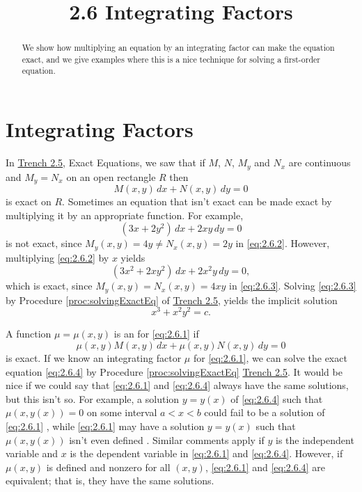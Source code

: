 \documentclass{ximera}
\title{2.6 Integrating Factors}
\begin{document}
\begin{abstract}
We show how multiplying an equation by an integrating factor can make the equation exact, and we give examples where this is a nice technique for solving a first-order equation.
\end{abstract}

\maketitle



\section*{Integrating Factors}
In \href{https://ximera.osu.edu/ode/main/exactEquations/exactEquations}{Trench 2.5}, Exact Equations, we saw that if $M$, $N$, $M_y$ and $N_x$ are
continuous and $M_y=N_x$ on an open rectangle $R$ then
\begin{equation} \label{eq:2.6.1}
M(x,y)\,dx+N(x,y)\,dy=0
\end{equation}
is exact on $R$. Sometimes an equation that isn't  exact can be made
exact by multiplying it by an appropriate function. For example,
\begin{equation}\label{eq:2.6.2}
(3x+2y^2)\,dx+2xy\,dy=0
\end{equation}
is  not exact, since
$M_y(x,y)=4y\neq  N_x(x,y)=2y$ in \eqref{eq:2.6.2}.
 However, multiplying \eqref{eq:2.6.2}  by $x$ yields
\begin{equation}\label{eq:2.6.3}
(3x^2+2xy^2)\,dx+2x^2y\,dy=0,
\end{equation}
which is exact, since
$M_y(x,y)=N_x(x,y)=4xy$ in \eqref{eq:2.6.3}.
Solving \eqref{eq:2.6.3} by Procedure \ref{proc:solvingExactEq} of \href{https://ximera.osu.edu/ode/main/exactEquations/exactEquations}{Trench 2.5},
 yields the implicit solution
$$
x^3+x^2y^2=c.
$$

A function $\mu=\mu(x,y)$ is  an  for
\eqref{eq:2.6.1}  if
\begin{equation}\label{eq:2.6.4}
 \mu(x,y)M (x,y)\,dx+\mu(x,y)N (x,y)\,dy=0
 \end{equation}
 is exact. If we know an integrating
factor $\mu$ for \eqref{eq:2.6.1}, we can solve the exact equation
\eqref{eq:2.6.4} by Procedure \ref{proc:solvingExactEq} \href{https://ximera.osu.edu/ode/main/exactEquations/exactEquations}{Trench 2.5}. It would be
nice
if we could say that \eqref{eq:2.6.1} and \eqref{eq:2.6.4} always have the
same solutions, but this isn't so. For example, a solution
$y=y(x)$ of \eqref{eq:2.6.4} such that $\mu(x,y(x))=0$ on some interval
$a<x<b$ could fail to be a solution of \eqref{eq:2.6.1}
, while
\eqref{eq:2.6.1} may have a solution $y=y(x)$ such that $\mu(x,y(x)) $
isn't even defined 
. Similar comments
apply if $y$ is the independent variable and $x$ is the dependent
variable  in \eqref{eq:2.6.1} and \eqref{eq:2.6.4}.  However, if $\mu(x,y)$
is defined and nonzero for all $(x,y)$,  \eqref{eq:2.6.1}  and
\eqref{eq:2.6.4} are equivalent; that is, they have the same solutions.
\end{document}
